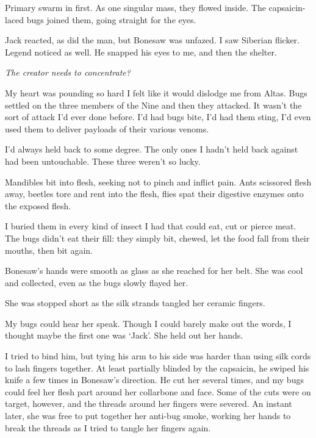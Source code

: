 Primary swarm in first.  As one singular mass, they flowed inside.  The capsaicin-laced bugs joined them, going straight for the eyes.



Jack reacted, as did the man, but Bonesaw was unfazed.  I saw Siberian flicker.  Legend noticed as well.  He snapped his eyes to me, and then the shelter.



\emph{The creator needs to concentrate?}



My heart was pounding so hard I felt like it would dislodge me from Altas.  Bugs settled on the three members of the Nine and then they attacked.  It wasn't the sort of attack I'd ever done before.  I'd had bugs bite, I'd had them sting, I'd even used them to deliver payloads of their various venoms.



I'd always held back to some degree.  The only ones I hadn't held back against had been untouchable.  These three weren't so lucky.



Mandibles bit into flesh, seeking not to pinch and inflict pain.  Ants scissored flesh away, beetles tore and rent into the flesh, flies spat their digestive enzymes onto the exposed flesh.



I buried them in every kind of insect I had that could eat, cut or pierce meat.  The bugs didn't eat their fill: they simply bit, chewed, let the food fall from their mouths, then bit again.



Bonesaw's hands were smooth as glass as she reached for her belt.  She was cool and collected, even as the bugs slowly flayed her.



She was stopped short as the silk strands tangled her ceramic fingers.



My bugs could hear her speak.  Though I could barely make out the words, I thought maybe the first one was `Jack'.  She held out her hands.



I tried to bind him, but tying his arm to his side was harder than using silk cords to lash fingers together.  At least partially blinded by the capsaicin, he swiped his knife a few times in Bonesaw's direction.  He cut her several times, and my bugs could feel her flesh part around her collarbone and face.  Some of the cuts were on target, however, and the threads around her fingers were severed.  An instant later, she was free to put together her anti-bug smoke, working her hands to break the threads as I tried to tangle her fingers again.



